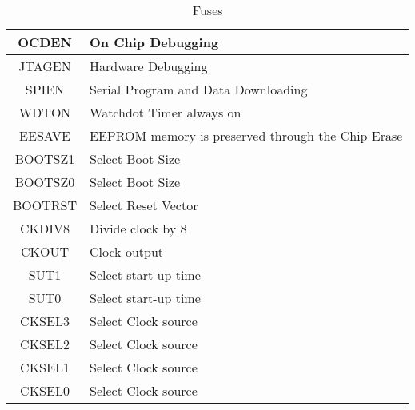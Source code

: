 \begin{longtable}{|c|l|} 
\caption{Fuses} \\
\hline
\label{tab:Fuses}
OCDEN & On Chip Debugging \\ \hline 
JTAGEN & Hardware Debugging \\ \hline 
SPIEN & Serial Program and Data Downloading \\ \hline 
WDTON & Watchdot Timer always on \\ \hline 
EESAVE & EEPROM memory is preserved through the Chip Erase \\ \hline 
BOOTSZ1 & Select Boot Size \\ \hline 
BOOTSZ0 & Select Boot Size \\ \hline 
BOOTRST & Select Reset Vector \\ \hline 
CKDIV8 & Divide clock by 8 \\ \hline 
CKOUT & Clock output \\ \hline 
SUT1 & Select start-up time \\ \hline 
SUT0 & Select start-up time \\ \hline 
CKSEL3 & Select Clock source \\ \hline 
CKSEL2 & Select Clock source \\ \hline 
CKSEL1 & Select Clock source \\ \hline 
CKSEL0 & Select Clock source \\ \hline 
\end{longtable} 
